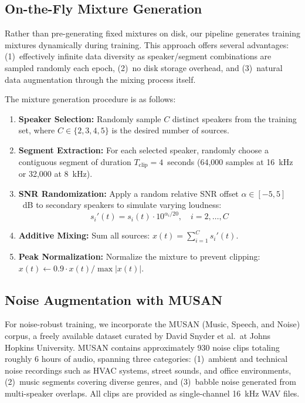 \documentclass[conference]{IEEEtran}
\begin{document}
\subsection{On-the-Fly Mixture Generation}

Rather than pre-generating fixed mixtures on disk, our pipeline generates training mixtures dynamically during training. This approach offers several advantages: (1)~effectively infinite data diversity as speaker/segment combinations are sampled randomly each epoch, (2)~no disk storage overhead, and (3)~natural data augmentation through the mixing process itself.

The mixture generation procedure is as follows:

\begin{enumerate}[leftmargin=*,nosep]
    \item \textbf{Speaker Selection:} Randomly sample $C$ distinct speakers from the training set, where $C \in \{2, 3, 4, 5\}$ is the desired number of sources.
    \item \textbf{Segment Extraction:} For each selected speaker, randomly choose a contiguous segment of duration $T_{\text{clip}} = 4$~seconds (64,000 samples at 16~kHz or 32,000 at 8~kHz).
    \item \textbf{SNR Randomization:} Apply a random relative SNR offset $\alpha \in [-5, 5]$~dB to secondary speakers to simulate varying loudness:
    \begin{equation}
    s_i'(t) = s_i(t) \cdot 10^{\alpha_i / 20}, \quad i = 2, \ldots, C
    \end{equation}
    \item \textbf{Additive Mixing:} Sum all sources: $x(t) = \sum_{i=1}^{C} s_i'(t)$.
    \item \textbf{Peak Normalization:} Normalize the mixture to prevent clipping: $x(t) \leftarrow 0.9 \cdot x(t) / \max|x(t)|$.
\end{enumerate}

\subsection{Noise Augmentation with MUSAN}

For noise-robust training, we incorporate the MUSAN (Music, Speech, and Noise) corpus, a freely available dataset curated by David Snyder et al.\ at Johns Hopkins University. MUSAN contains approximately 930 noise clips totaling roughly 6 hours of audio, spanning three categories: (1)~ambient and technical noise recordings such as HVAC systems, street sounds, and office environments, (2)~music segments covering diverse genres, and (3)~babble noise generated from multi-speaker overlaps. All clips are provided as single-channel 16~kHz WAV files.
\end{document}
